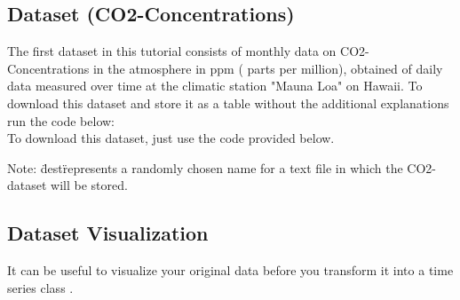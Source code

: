 \documentclass[11pt, a4paper]{article} %
\begin{document}
\subsection{Dataset (CO2-Concentrations)}%
The first dataset in this tutorial consists of monthly data on CO2- Concentrations in the atmosphere in ppm ( parts per million),  obtained of daily data measured over time at the climatic station "Mauna Loa" on Hawaii. To download this dataset and store it as a table without the additional explanations run the code below: 
\\
To download this dataset, just use the code provided below.
\begin{Schunk}
\end{Schunk}
\noindent Note: \"dest\" represents a randomly chosen name for a text file in which the CO2- dataset will be stored. \\

\subsection{Dataset Visualization}%
It can be useful to visualize your original data before you transform it into a time series class . 
\end{document}
